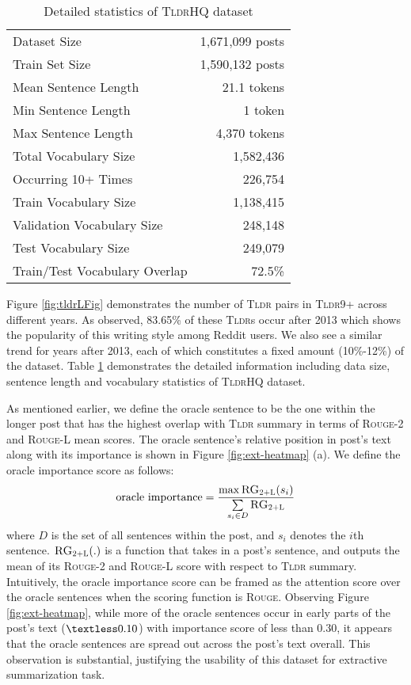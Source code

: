 \documentclass[11pt]{article}
\newcommand{\tldrl}{\textsc{Tldr9+}}
\newcommand{\tldrs}{\textsc{TldrHQ}}
\newcommand{\tldr}{\textsc{Tldr}}
\begin{document}
\begin{table}[t]
    \centering
\begin{tabular}{lr}
    \toprule
     Dataset Size & 1,671,099 posts \\
     Train Set Size & 1,590,132 posts \\
     \midrule
     Mean Sentence Length & 21.1 tokens\\
     Min Sentence Length & 1 token \\
     Max Sentence Length & 4,370 tokens \\
     \midrule
     Total Vocabulary Size & 1,582,436 \\
     Occurring 10+ Times & 226,754 \\
     Train Vocabulary Size & 1,138,415 \\
     Validation Vocabulary Size & 248,148 \\
     Test Vocabulary Size & 249,079 \\
     
     Train/Test Vocabulary Overlap & 72.5\% \\
     \bottomrule
    \end{tabular}
\caption{Detailed statistics of \tldrs{} dataset}
    \label{tab:tldrQ_stat}
\end{table}

Figure \ref{fig:tldrLFig} demonstrates the number of \tldr{} pairs in \tldrl{} across different years. As observed, 83.65\% of these \tldr s occur after 2013 which shows the popularity of this writing style among Reddit users.  We also see a similar trend for years after 2013, each of which constitutes a fixed amount (10\%-12\%) of the dataset. Table \ref{tab:tldrQ_stat} demonstrates the detailed information including data size, sentence length and vocabulary statistics of \tldrs{} dataset. 

As mentioned earlier, we define the oracle sentence to be the one within the longer post that has the highest overlap with \tldr{} summary in terms of \textsc{Rouge-2} and \textsc{Rouge-L} mean scores.  The oracle sentence's relative position in post's text along with its importance is shown in Figure \ref{fig:ext-heatmap} (a). We define the oracle importance score as follows: 
\begin{equation*}
    \text{oracle importance} = \frac{\max \textsc{RG}_{\textsc{2+L}}(s_i)}{\sum\limits_{s_i \in D}{\textsc{RG}_{\textsc{2+L}}}}
\end{equation*}
where $D$ is the set of all sentences within the post, and  $s_i$ denotes the $i$th sentence. $\textsc{RG}_{\textsc{2+L}}(.)$ is a function that takes in a post's sentence, and outputs the mean of its \textsc{Rouge-2} and \textsc{Rouge-L} score with respect to \tldr{} summary. Intuitively, the oracle importance score can be framed as the attention score over the oracle sentences when the scoring function is \textsc{Rouge}. Observing Figure \ref{fig:ext-heatmap}, while more of the oracle sentences occur in early parts of the post's text ($\textless 0.10$) with importance score of less than 0.30, it appears that the oracle sentences are spread out across the post's text overall. This observation is substantial, justifying the usability of this dataset for extractive summarization task.
\end{document}

